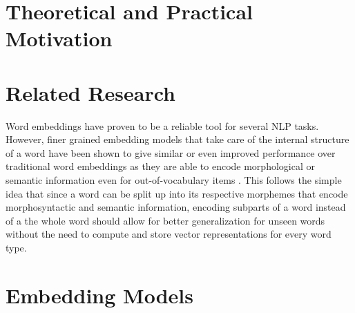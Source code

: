 \documentclass[11pt]{article}
\begin{document}
\section{Theoretical and Practical Motivation}
\section{Related Research}
Word embeddings have proven to be a reliable tool for several NLP tasks. However, finer grained embedding models that take care of the internal structure of a word have been shown to give similar or even improved performance over traditional word embeddings as they are able to encode morphological \cite{dos2014learning} or semantic \cite{chen2015joint} information even for out-of-vocabulary items \cite{ling2015finding}. This follows the simple idea that since a word can be split up into its respective morphemes that encode morphosyntactic and semantic information, encoding subparts of a word instead of a the whole word should allow for better generalization for unseen words without the need to compute and store vector representations for every word type. 
\section{Embedding Models}
\end{document}

